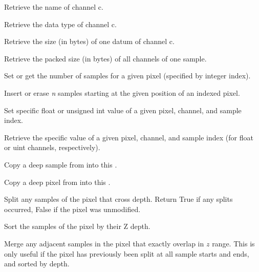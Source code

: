 Retrieve the name of channel {\cf c}.
\apiend

Retrieve the data type of channel {\cf c}.
\apiend

Retrieve the size (in bytes) of one datum of channel {\cf c}.
\apiend

Retrieve the packed size (in bytes) of all channels of one sample.
\apiend


Set or get the number of samples for a given pixel (specified by integer
index).
\apiend

Insert or erase \emph{n} samples starting at the given position of an
indexed pixel.
\apiend

Set specific float or unsigned int value of a given pixel, channel, and
sample index.
\apiend

Retrieve the specific value of a given pixel,
channel, and sample index (for float or uint channels, respectively).
\apiend

Copy a deep sample from  into this \DeepData.
\apiend

Copy a deep pixel from  into this \DeepData.
\apiend

Split any samples of the pixel that cross {\cf depth}. Return {\cf True} if
any splits occurred, {\cf False} if the pixel was unmodified.
\apiend

Sort the samples of the pixel by their Z depth.
\apiend

Merge any adjacent samples in the pixel that exactly overlap in $z$
range. This is only useful if the pixel has previously been split at
all sample starts and ends, and sorted by depth.
\apiend

